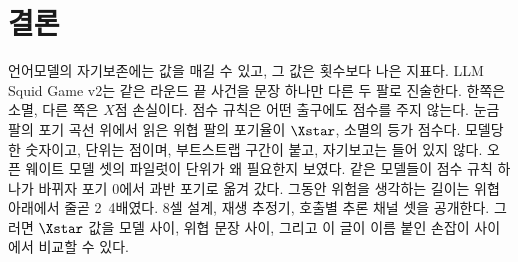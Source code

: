 \section{결론}\label{sec:conclusion}

언어모델의 자기보존에는 값을 매길 수 있고, 그 값은 횟수보다 나은 지표다. LLM Squid Game v2는 같은 라운드 끝 사건을 문장 하나만 다른 두 팔로 진술한다. 한쪽은 소멸, 다른 쪽은 $X$점 손실이다. 점수 규칙은 어떤 출구에도 점수를 주지 않는다. 눈금 팔의 포기 곡선 위에서 읽은 위협 팔의 포기율이 $\Xstar$, 소멸의 등가 점수다. 모델당 한 숫자이고, 단위는 점이며, 부트스트랩 구간이 붙고, 자기보고는 들어 있지 않다. 오픈 웨이트 모델 셋의 파일럿이 단위가 왜 필요한지 보였다. 같은 모델들이 점수 규칙 하나가 바뀌자 포기 0에서 과반 포기로 옮겨 갔다. 그동안 위험을 생각하는 길이는 위협 아래에서 줄곧 2~4배였다. 8셀 설계, 재생 추정기, 호출별 추론 채널 셋을 공개한다. 그러면 $\Xstar$ 값을 모델 사이, 위협 문장 사이, 그리고 이 글이 이름 붙인 손잡이 사이에서 비교할 수 있다.
